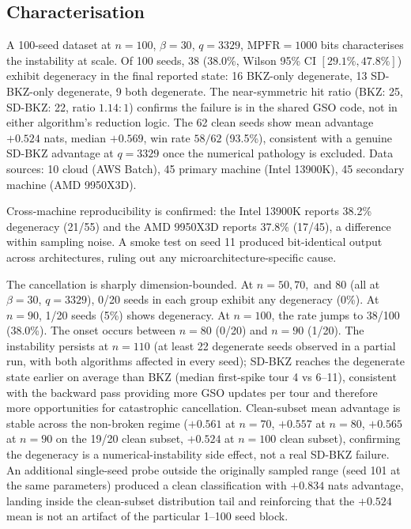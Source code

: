 \documentclass[journal=cic,version=preprint]{iacrj}
\begin{document}
\subsection{Characterisation}

A 100-seed dataset at $n=100$, $\beta=30$, $q=3329$, $\mathrm{MPFR}=1000$ bits characterises the instability at scale. Of 100 seeds, 38 (38.0\%, Wilson 95\% CI $[29.1\%, 47.8\%]$) exhibit degeneracy in the final reported state: 16 BKZ-only degenerate, 13 SD-BKZ-only degenerate, 9 both degenerate. The near-symmetric hit ratio (BKZ: 25, SD-BKZ: 22, ratio $1.14{:}1$) confirms the failure is in the shared GSO code, not in either algorithm's reduction logic. The 62 clean seeds show mean advantage $+0.524$ nats, median $+0.569$, win rate $58/62$ (93.5\%), consistent with a genuine SD-BKZ advantage at $q=3329$ once the numerical pathology is excluded. Data sources: 10 cloud (AWS Batch), 45 primary machine (Intel 13900K), 45 secondary machine (AMD 9950X3D).

Cross-machine reproducibility is confirmed: the Intel 13900K reports 38.2\% degeneracy (21/55) and the AMD 9950X3D reports 37.8\% (17/45), a difference within sampling noise. A smoke test on seed 11 produced bit-identical output across architectures, ruling out any microarchitecture-specific cause.

The cancellation is sharply dimension-bounded. At $n=50, 70,$ and $80$ (all at $\beta=30$, $q=3329$), 0/20 seeds in each group exhibit any degeneracy (0\%). At $n=90$, 1/20 seeds (5\%) shows degeneracy. At $n=100$, the rate jumps to 38/100 (38.0\%). The onset occurs between $n=80$ (0/20) and $n=90$ (1/20). The instability persists at $n=110$ (at least 22 degenerate seeds observed in a partial run, with both algorithms affected in every seed); SD-BKZ reaches the degenerate state earlier on average than BKZ (median first-spike tour 4 vs 6--11), consistent with the backward pass providing more GSO updates per tour and therefore more opportunities for catastrophic cancellation. Clean-subset mean advantage is stable across the non-broken regime ($+0.561$ at $n=70$, $+0.557$ at $n=80$, $+0.565$ at $n=90$ on the 19/20 clean subset, $+0.524$ at $n=100$ clean subset), confirming the degeneracy is a numerical-instability side effect, not a real SD-BKZ failure. An additional single-seed probe outside the originally sampled range (seed 101 at the same parameters) produced a clean classification with $+0.834$ nats advantage, landing inside the clean-subset distribution tail and reinforcing that the $+0.524$ mean is not an artifact of the particular 1--100 seed block.
\end{document}
